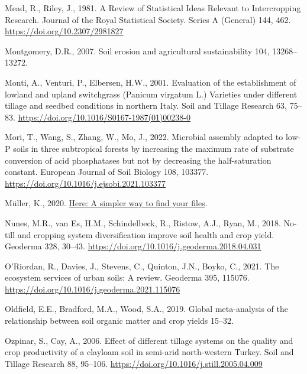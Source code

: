 \documentclass[
  12pt,
]{article}
\newlength{\cslhangindent}
\newlength{\cslentryspacingunit} %
\newenvironment{CSLReferences}[2] %
 {%
  \setlength{\parindent}{0pt}
  \ifodd #1
  \let\oldpar\par
  \def\par{\hangindent=\cslhangindent\oldpar}
  \fi
  \setlength{\parskip}{#2\cslentryspacingunit}
 }%
 {}
\begin{document}
\begin{CSLReferences}{1}{0}
\leavevmode{}%
Mead, R., Riley, J., 1981. A {Review} of {Statistical Ideas Relevant} to {Intercropping Research}. Journal of the Royal Statistical Society. Series A (General) 144, 462. \url{https://doi.org/10.2307/2981827}

\leavevmode{}%
Montgomery, D.R., 2007. Soil erosion and agricultural sustainability 104, 13268--13272.

\leavevmode{}%
Monti, A., Venturi, P., Elbersen, H.W., 2001. Evaluation of the establishment of lowland and upland switchgrass ({Panicum} virgatum {L}.) Varieties under different tillage and seedbed conditions in northern {Italy}. Soil and Tillage Research 63, 75--83. \url{https://doi.org/10.1016/S0167-1987(01)00238-0}

\leavevmode{}%
Mori, T., Wang, S., Zhang, W., Mo, J., 2022. Microbial assembly adapted to low-{P} soils in three subtropical forests by increasing the maximum rate of substrate conversion of acid phosphatases but not by decreasing the half-saturation constant. European Journal of Soil Biology 108, 103377. \url{https://doi.org/10.1016/j.ejsobi.2021.103377}

\leavevmode{}%
Müller, K., 2020. \href{https://CRAN.R-project.org/package=here}{Here: A simpler way to find your files}.

\leavevmode{}%
Nunes, M.R., van Es, H.M., Schindelbeck, R., Ristow, A.J., Ryan, M., 2018. No-till and cropping system diversification improve soil health and crop yield. Geoderma 328, 30--43. \url{https://doi.org/10.1016/j.geoderma.2018.04.031}

\leavevmode{}%
O'Riordan, R., Davies, J., Stevens, C., Quinton, J.N., Boyko, C., 2021. The ecosystem services of urban soils: {A} review. Geoderma 395, 115076. \url{https://doi.org/10.1016/j.geoderma.2021.115076}

\leavevmode{}%
Oldfield, E.E., Bradford, M.A., Wood, S.A., 2019. Global meta-analysis of the relationship between soil organic matter and crop yields 15--32.

\leavevmode{}%
Ozpinar, S., Cay, A., 2006. Effect of different tillage systems on the quality and crop productivity of a clay\textendash loam soil in semi-arid north-western {Turkey}. Soil and Tillage Research 88, 95--106. \url{https://doi.org/10.1016/j.still.2005.04.009}


\end{CSLReferences}
\end{document}
